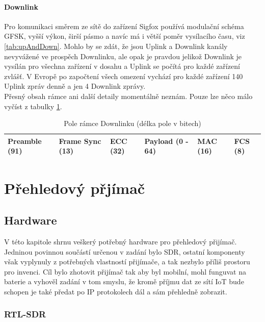 \documentclass{ctuthesis}
\begin{document}
\subsection{Downlink}
Pro komunikaci směrem ze sítě do zařízení Sigfox používá modulační schéma GFSK, vyšší výkon, širší pásmo a navíc má i větší poměr vysílacího času, viz \ref{tab:upAndDown}. Mohlo by se zdát, že jsou Uplink a Downlink kanály nevyvážené ve prospěch Downlinku, ale opak je pravdou jelikož Downlink je vysílán pro všechna zařízení v dosahu a Uplink se počítá pro každé zařízení zvlášť. V Evropě po započtení všech omezení vychází pro každé zařízení 140 Uplink zpráv denně a jen 4 Downlink zprávy.\\
Přesný obsah rámce ani další detaily momentálně neznám. Pouze lze něco málo vyčíst z tabulky \ref{tab:downlinkFrame}.
\begin{table}[]
\begin{tabular}{@{}|l|l|l|l|l|l|@{}}
\toprule
Preamble (91) & Frame Sync (13) & ECC (32) & Payload (0 - 64) & MAC (16) & FCS (8) \\ \bottomrule
\end{tabular}
\caption{Pole rámce Downlinku (délka pole v bitech)}
\label{tab:downlinkFrame}
\end{table}

\part{Přehledový přjímač}
\chapter{Hardware}
V této kapitole shrnu veškerý potřebný hardware pro přehledový přijímač. Jedninou povinnou součástí určenou v zadání bylo SDR, ostatní komponenty však vyplynuly z potřebných vlastností přijímače, a tak nezbylo příliš prostoru pro invenci. Cíl bylo zhotovit přijímač tak aby byl mobilní, mohl funguvat na baterie a vyhověl zadání v tom smyslu, že kromě příjmu dat ze sítí IoT bude schopen je také předat po IP protokolech dál a sám přehledně zobrazit.
\section{RTL-SDR}
\end{document}
